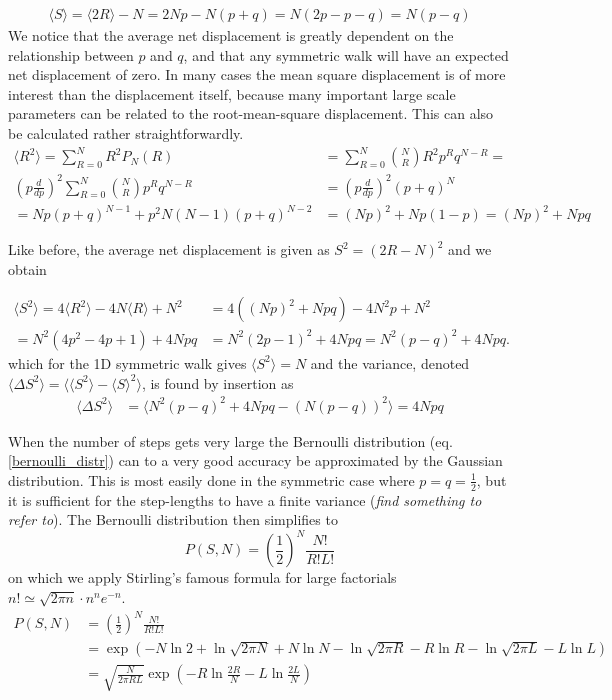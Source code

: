 \begin{align*}
 \langle S\rangle = \langle2R\rangle -N = 2Np-N(p+q) = N(2p-p-q) = N(p-q)
\end{align*}
We notice that the average net displacement is greatly dependent on the relationship between $p$ and $q$, and that any symmetric walk will have an expected net displacement of zero. 
In many cases the mean square displacement is of more interest than the displacement itself, because many important large scale parameters can be related to the root-mean-square displacement. 
This can also be calculated rather straightforwardly. 
\begin{align*}
  \langle R^2\rangle =  \sum\limits_{R=0}^N R^2P_N(R) &=  \sum\limits_{R=0}^N {N\choose R}R^2p^Rq^{N-R} = \\
 \left(p\frac{d}{dp}\right)^2 \sum\limits_{R=0}^N {N\choose R}p^Rq^{N-R} &= \left(p\frac{d}{dp}\right)^2(p+q)^N \\
 = Np(p+q)^{N-1} +p^2N(N-1)(p+q)^{N-2} &= (Np)^2 +Np(1-p) = (Np)^2 +Npq
\end{align*}

Like before, the average net displacement is given as $S^2 = (2R-N)^2$ and we obtain

\begin{align*}
 \langle S^2\rangle = 4\langle R^2\rangle -4N\langle R\rangle + N^2 &= 4((Np)^2 +Npq) -4N^2p + N^2\\
 = N^2(4p^2 -4p +1) +4Npq &= N^2(2p-1)^2 +4Npq = N^2(p-q)^2 +4Npq.
\end{align*}
which for the 1D symmetric walk gives $\langle S^2\rangle =N$ and the variance, denoted $\langle\Delta S^2\rangle = \langle\langle S^2\rangle-\langle S\rangle^2\rangle$, is found by insertion as
\begin{align}
 \langle\Delta S^2\rangle &= \langle N^2(p-q)^2 +4Npq - ( N(p-q))^2\rangle= 4Npq 
\end{align}

When the number of steps gets very large the Bernoulli distribution (eq. \ref{bernoulli_distr}) can to a very good accuracy be approximated by the Gaussian distribution. 
This is most easily done in the symmetric case where $p=q=\frac{1}{2}$, but it is sufficient for the step-lengths to have a finite variance (\emph{find something to refer to}). 
The Bernoulli distribution then simplifies to
\begin{equation}
 P(S,N) = \left(\frac{1}{2}\right)^N\frac{N!}{R!L!}
\end{equation}
on which we apply Stirling's famous formula for large factorials $n!\simeq\sqrt{2\pi n}\cdot n^ne^{-n}$.
\begin{align*}
 P(S,N) &= \left(\frac{1}{2}\right)^N\frac{N!}{R!L!} \\
 &= \exp\left(-N\ln2+\ln\sqrt{2\pi N}+N\ln N - \ln\sqrt{2\pi R} -R\ln R - \ln\sqrt{2\pi L} - L\ln L \right) \\
 &= \sqrt{\frac{N}{2\pi RL}}\exp\left(-R\ln\frac{2R}{N}-L\ln\frac{2L}{N}\right)
\end{align*}

